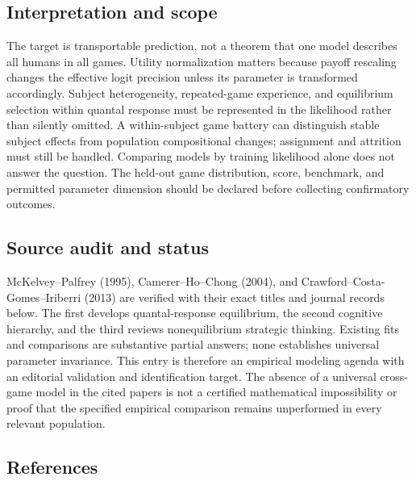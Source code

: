 \documentclass[11pt,a4paper]{article}
\begin{document}
\subsection*{Interpretation and scope}

The target is transportable prediction, not a theorem that one model describes all humans in all games. Utility normalization matters because payoff rescaling changes the effective logit precision unless its parameter is transformed accordingly. Subject heterogeneity, repeated-game experience, and equilibrium selection within quantal response must be represented in the likelihood rather than silently omitted. A within-subject game battery can distinguish stable subject effects from population compositional changes; assignment and attrition must still be handled. Comparing models by training likelihood alone does not answer the question. The held-out game distribution, score, benchmark, and permitted parameter dimension should be declared before collecting confirmatory outcomes.

\subsection*{Source audit and status}

McKelvey--Palfrey (1995), Camerer--Ho--Chong (2004), and Crawford--Costa-Gomes--Iriberri (2013) are verified with their exact titles and journal records below. The first develops quantal-response equilibrium, the second cognitive hierarchy, and the third reviews nonequilibrium strategic thinking. Existing fits and comparisons are substantive partial answers; none establishes universal parameter invariance. This entry is therefore an empirical modeling agenda with an editorial validation and identification target. The absence of a universal cross-game model in the cited papers is not a certified mathematical impossibility or proof that the specified empirical comparison remains unperformed in every relevant population.

\subsection*{References}
\end{document}
